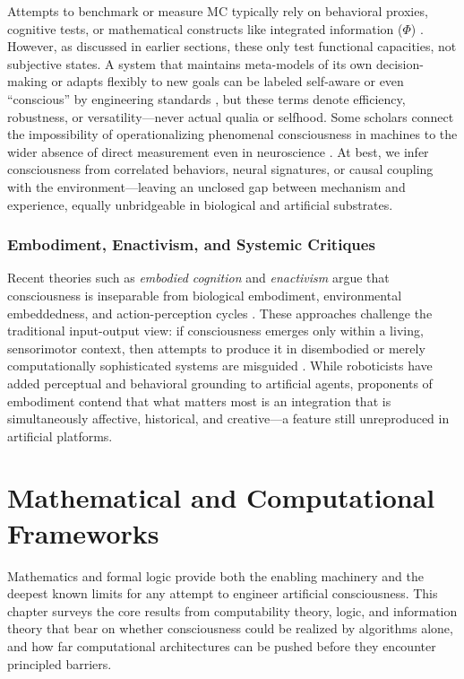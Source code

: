 Attempts to benchmark or measure MC typically rely on behavioral proxies, cognitive tests, or mathematical constructs like integrated information ($\Phi$) \cite{albantakis2023integrated,tononi2016integrated}. However, as discussed in earlier sections, these only test functional capacities, not subjective states. A system that maintains meta-models of its own decision-making or adapts flexibly to new goals can be labeled self-aware or even ``conscious'' by engineering standards \cite{kounev2017notion}, but these terms denote efficiency, robustness, or versatility---never actual qualia or selfhood. Some scholars connect the impossibility of operationalizing phenomenal consciousness in machines to the wider absence of direct measurement even in neuroscience \cite{butlin2023consciousness,francken2022consciousness}. At best, we infer consciousness from correlated behaviors, neural signatures, or causal coupling with the environment---leaving an unclosed gap between mechanism and experience, equally unbridgeable in biological and artificial substrates.

\subsubsection{Embodiment, Enactivism, and Systemic Critiques}

Recent theories such as \emph{embodied cognition} and \emph{enactivism} argue that consciousness is inseparable from biological embodiment, environmental embeddedness, and action-perception cycles \cite{oregan2001sensorimotor}. These approaches challenge the traditional input-output view: if consciousness emerges only within a living, sensorimotor context, then attempts to produce it in disembodied or merely computationally sophisticated systems are misguided \cite{gamez2008progress}. While roboticists have added perceptual and behavioral grounding to artificial agents, proponents of embodiment contend that what matters most is an integration that is simultaneously affective, historical, and creative---a feature still unreproduced in artificial platforms.


\section{Mathematical and Computational Frameworks}
\label{sec:mathematical_frameworks}

Mathematics and formal logic provide both the enabling machinery and the deepest known limits for any attempt to engineer artificial consciousness. This chapter surveys the core results from computability theory, logic, and information theory that bear on whether consciousness could be realized by algorithms alone, and how far computational architectures can be pushed before they encounter principled barriers.

